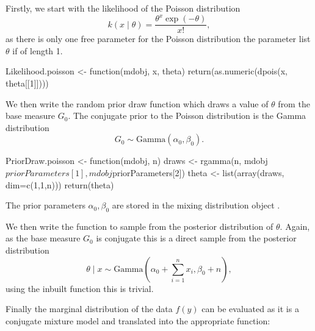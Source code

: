 \documentclass[nojss]{jss}
\begin{document}
Firstly, we start with the likelihood of the Poisson distribution
\begin{equation*}
k(x \mid \theta) = \frac{\theta ^x \exp(-\theta)}{x!},
\end{equation*}
as there is only one free parameter for the Poisson distribution the parameter list $\theta$ if of length 1.
\begin{CodeInput}
Likelihood.poisson <- function(mdobj, x, theta){
  return(as.numeric(dpois(x, theta[[1]])))
}
\end{CodeInput}
We then write the random prior draw function which draws a value of $\theta$ from the base measure $G_0$. The conjugate prior to the Poisson distribution is the Gamma distribution
\begin{equation*}
G_0 \sim \text{Gamma} (\alpha _0, \beta _0).
\end{equation*}
\begin{CodeInput}
PriorDraw.poisson <- function(mdobj, n){
  draws <- rgamma(n, mdobj$priorParameters[1], mdobj$priorParameters[2])
  theta <- list(array(draws, dim=c(1,1,n)))
  return(theta)
 }
\end{CodeInput}
The prior parameters $\alpha_0, \beta_0$ are stored in the mixing distribution object .

We then write the  function to sample from the posterior distribution of $\theta$. Again, as the base measure $G_0$ is conjugate this is a direct sample from the posterior distribution
\begin{equation*}
\theta \mid x \sim \text{Gamma} (\alpha _0 + \sum_{i=1} ^n x_i, \beta_0 + n),
\end{equation*}
using the inbuilt  function this is trivial.

Finally the marginal distribution of the data $f(y)$ can be evaluated as it is a conjugate mixture model and translated into the appropriate  function:
\end{document}
